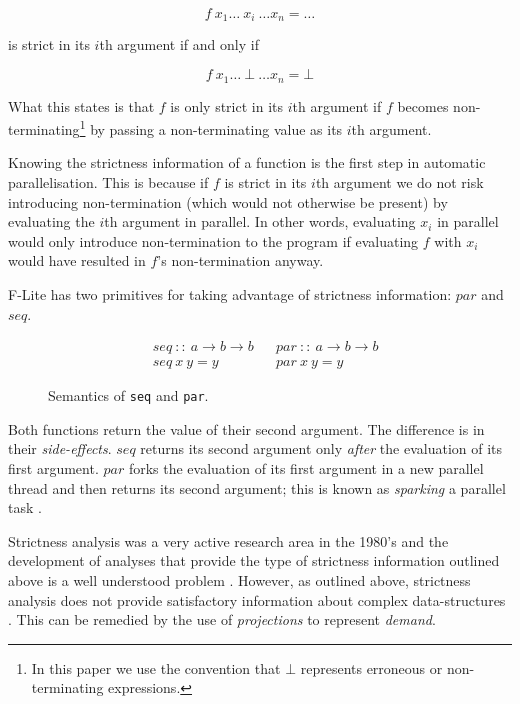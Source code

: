 $$
    f\ x_{1} \dots \ x_{i} \ \dots x_{n} = \dots
$$

\noindent is strict in its $i$th argument if and only if

$$
    f\ x_{1} \dots \ \bot \ \dots x_{n} = \bot
$$

What this states is that $f$ is only strict in its $i$th argument if $f$
becomes non-terminating\footnote{In this paper we use the convention that
$\bot$ represents erroneous or non-terminating expressions.} by passing a
non-terminating value as its $i$th argument.

Knowing the strictness information of a function is the first step in automatic
parallelisation. This is because if $f$ is strict in its $i$th argument we do
not risk introducing non-termination (which would not otherwise be present) by
evaluating the $i$th argument in parallel. In other words, evaluating $x_{i}$ in
parallel would only introduce non-termination to the program if evaluating $f$
with $x_{i}$ would have resulted in $f$'s non-termination anyway.

F-Lite has two primitives for taking advantage of strictness information: $par$
and $seq$.
\begin{figure}
\begin{align*}
    &seq \ :: \ a \rightarrow b \rightarrow b &&par \ :: \ a \rightarrow b \rightarrow b \\
    &seq \ x \ y = y                          &&par \ x \ y = y
\end{align*}
\caption{Semantics of \texttt{seq} and \texttt{par}.}
\label{fig:seqandpar}
\end{figure}

Both functions return the value of their second argument. The difference is in
their \emph{side-effects}. $seq$ returns its second argument only \emph{after}
the evaluation of its first argument. $par$ forks the evaluation of its first
argument in a new parallel thread and then returns its second argument; this is
known as \emph{sparking} a parallel task \citep{clack1986four}.

Strictness analysis was a very active research area in the 1980's and the
development of analyses that provide the type of strictness information
outlined above is a well understood problem \citep{mycroft1980theory,
clack1985strictness, burn1986strictness}.  However, as outlined above,
strictness analysis does not provide satisfactory information about complex
data-structures \citep{wadler1987strictness}. This can be remedied by the
use of \emph{projections} to represent \emph{demand}.


